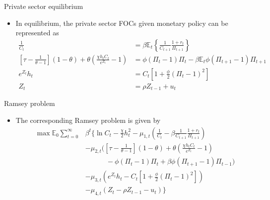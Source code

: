 \documentclass[handout,usepdftitle=false,xcolor=dvipsnames,aspectratio=169]{beamer}
\begin{document}
\begin{frame}{Private sector equilibrium}
  \begin{itemize}
    \item In equilibrium, the private sector FOCs given monetary policy can be represented as
          \begin{align}
            \frac{1}{C_{t}}            & =\beta \mathbb{E}_{t}\left \{ \frac{1}{C_{t+1}}\frac{1+r_{t}}{\Pi
            _{t+1}}\right \}                                                                                 \\
            \left[\tau-\frac{1}{\theta-1}\right](1-\theta) +\theta\left(\frac{\chi
            h_t C_t}{e^{Z_t}}-1\right) & = \phi(\Pi_t-1)\Pi_t - \beta \mathbb{E}_t\phi(\Pi_{t+1}-1)\Pi_{t+1} \\
            e^{Z_{t}}h_{t}             & = C_{t}\left[1+\frac{\phi }{2}\left( \Pi _{t}-1\right) ^{2}\right]  \\
            Z_t                        & = \rho Z_{t-1} + u_t
          \end{align}
  \end{itemize}

\end{frame}


\begin{frame}{Ramsey problem}
  \begin{itemize}
    \item The corresponding Ramsey problem is given by
          \begin{equation}
            \begin{split}
              \max \mathbb{E}_{0}\sum_{t=0}^\infty & \beta ^{t}\Bigg\{ \ln C_{t}-\frac{\chi}{2}h_t^2 -\mu_{1,t}\left( \frac{1}{C_{t}}- \beta \frac{1}{C_{t+1}}\frac{1+r_{t}}{\Pi
              _{t+1}}\right)                                                                                                                                                     \\
                                                   & -\mu_{2,t}\Bigg(  \left[\tau-\frac{1}{\theta-1}\right](1-\theta) +\theta\left(\frac{\chi
              h_t C_t}{e^{Z_t}}-1\right)                                                                                                                                         \\
                                                   & \quad\quad\quad- \phi(\Pi_t-1)\Pi_t + \beta \phi(\Pi_{t+1}-1)\Pi_{t-1}\Bigg)                                                \\
                                                   & -\mu _{3,t}\left(e^{Z_{t}}h_{t} - C_{t}\left[1+\frac{\phi }{2}\left( \Pi _{t}-1\right) ^{2}\right]\right)                   \\
                                                   & -\mu_{4,t}\left(Z_t - \rho Z_{t-1} - u_t\right)\Bigg\}
            \end{split}
          \end{equation}
  \end{itemize}
\end{frame}
\end{document}
